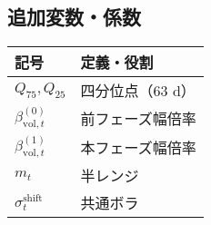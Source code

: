 \subsection*{追加変数・係数}
\begin{flushleft}
\begin{minipage}{0.88\textwidth}
\begin{tabularx}{\textwidth}{@{}lX@{}}
\toprule
記号 & 定義・役割 \\
\midrule
\(Q_{75},Q_{25}\) & 四分位点（63 d）\\
\(\beta_{\text{vol},t}^{(0)}\) & 前フェーズ幅倍率\\
\(\beta_{\text{vol},t}^{(1)}\) & 本フェーズ幅倍率\\
\(m_t\) & 半レンジ\\
\(\sigma_t^{\text{shift}}\) & 共通ボラ\\
\bottomrule
\end{tabularx}
\end{minipage}
\end{flushleft}
